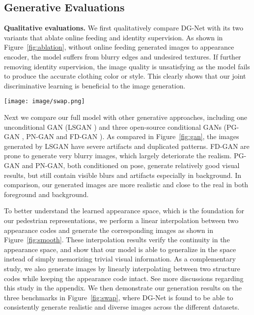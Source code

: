 \documentclass[10pt,twocolumn,letterpaper]{article}
\begin{document}
\subsection{Generative Evaluations}

\textbf{Qualitative evaluations.}
We first qualitatively compare DG-Net with its two variants that ablate online feeding and identity supervision. As shown in Figure~\ref{fig:ablation}, without online feeding generated images to appearance encoder, the model suffers from blurry edges and undesired textures.
If further removing identity supervision, the image quality is unsatisfying as the model fails to produce the accurate clothing color or style. This clearly shows that our joint discriminative learning is beneficial to the image generation. 

\begin{figure*}[tbh]
\begin{center}
   \texttt{[image: image/swap.png]}
\end{center}
\vspace{-.2in}
   \caption{
   Examples of our generated images by swapping appearance or structure codes on the three datasets. All images are sampled from the test sets.}
\label{fig:swap}
\end{figure*}

Next we compare our full model with other generative approaches, including one unconditional GAN (LSGAN \cite{mao2017least}) and three open-source conditional GANs (PG-GAN \cite{ma2017pose}, PN-GAN \cite{qian2017pose} and FD-GAN \cite{ge2018fdgan}). As compared in Figure~\ref{fig:gan}, the images generated by LSGAN have severe artifacts and duplicated patterns. FD-GAN are prone to generate very blurry images, which largely deteriorate the realism. PG-GAN and PN-GAN, both conditioned on pose, generate relatively good visual results, but still contain visible blurs and artifacts especially in background. In comparison, our generated images are more realistic and close to the real in both foreground and background. 

To better understand the learned appearance space, which is the foundation for our pedestrian representations, we perform a linear interpolation between two appearance codes and generate the corresponding images as shown in Figure~\ref{fig:smooth}. These interpolation results verify the continuity in the appearance space, and show that our model is able to generalize in the space instead of simply memorizing trivial visual information. As a complementary study, we also generate images by linearly interpolating between two structure codes while keeping the appearance code intact. See more discussions regarding this study in the appendix. We then demonstrate our generation results on the three benchmarks in Figure~\ref{fig:swap}, where DG-Net is found to be able to consistently generate realistic and diverse images across the different datasets.
\end{document}
